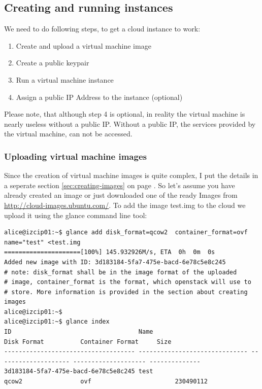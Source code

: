 \documentclass[a4paper,ngerman,bibtotocliststotoc]{scrartcl}
\begin{document}
\subsection{Creating and running instances}
\label{sec:creat-runn-inst}
We need to do following steps, to get a cloud instance to work:
\begin{enumerate}
\item Create and upload a virtual machine image
\item Create a public keypair
\item Run a virtual machine instance
\item Assign a public IP Address to the instance (optional)
\end{enumerate}
Please note, that although step 4 is optional, in reality the virtual machine is nearly useless without
a public IP. Without a public IP, the services provided by the virtual
machine, can not be accessed. 

\subsubsection{Uploading virtual machine images}
\label{sec:create-uplo-virt}
Since the creation of virtual machine images is quite complex, I put
the details in a seperate section \ref{sec:creating-images} on page
\pageref{sec:creating-images}. So let's assume you have already created an
image or just downloaded one of the ready Images from
\url{http://cloud-images.ubuntu.com/}. 
To add the image test.img to the cloud we upload it using the glance
command line tool:
\begin{verbatim}
alice@izcip01:~$ glance add disk_format=qcow2  container_format=ovf name="test" <test.img
=====================[100%] 145.932926M/s, ETA  0h  0m  0s
Added new image with ID: 3d183184-5fa7-475e-bacd-6e78c5e8c245
# note: disk_format shall be in the image format of the uploaded
# image, container_format is the format, which openstack will use to
# store. More information is provided in the section about creating images
alice@izcip01:~$
alice@izcip01:~$ glance index 
ID                                   Name                           Disk Format          Container Format     Size          
------------------------------------ ------------------------------ -------------------- -------------------- --------------
3d183184-5fa7-475e-bacd-6e78c5e8c245 test                            qcow2                ovf                       230490112
\end{verbatim}
\end{document}
